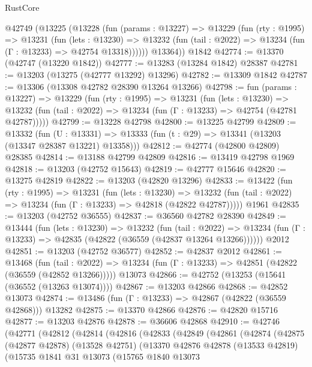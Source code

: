 \begin{lexlean}{RustCore}
\begin{coremodule}
    @42749
      (@13225
        (@13228
          (fun (params : @13227) =>
          @13229
            (fun (rty : @1995) =>
            @13231
              (fun (lets : @13230) =>
              @13232 (fun (tail : @2022) => @13234 (fun (Γ : @13233) => @42754 @13318))))))
        @13364))
    @1842
@42774 := @13370 (@42747 (@13220 @1842))
@42777 := @13283 (@13284 @1842) @28387
@42781 := @13203 (@13275 (@42777 @13292) @13296)
@42782 := @13309 @1842
@42787 := @13306 (@13308 @42782 @28390 @13264 @13266)
@42798 := fun (params : @13227) =>
  @13229
    (fun (rty : @1995) =>
    @13231
      (fun (lets : @13230) =>
      @13232 (fun (tail : @2022) => @13234 (fun (Γ : @13233) => @42754 (@42781 @42787)))))
@42799 := @13228 @42798
@42800 := @13225 @42799
@42809 := @13332
    (fun (U : @13331) => @13333 (fun (t : @29) => @13341 (@13203 (@13347 @28387 @13221) @13358)))
@42812 := @42774 (@42800 @42809) @28385
@42814 := @13188 @42799 @42809
@42816 := @13419 @42798 @1969
@42818 := @13203 (@42752 @15643)
@42819 := @42777 @15646
@42820 := @13275 @42819
@42822 := @13203 (@42820 @13296)
@42833 := @13422
    (fun (rty : @1995) =>
    @13231
      (fun (lets : @13230) =>
      @13232 (fun (tail : @2022) => @13234 (fun (Γ : @13233) => @42818 (@42822 @42787)))))
    @1961
@42835 := @13203 (@42752 @36555)
@42837 := @36560 @42782 @28390
@42849 := @13444
    (fun (lets : @13230) =>
    @13232
      (fun (tail : @2022) =>
      @13234 (fun (Γ : @13233) => @42835 (@42822 (@36559 (@42837 @13264 @13266))))))
    @2012
@42851 := @13203 (@42752 @36577)
@42852 := @42837 @2012
@42861 := @13468
    (fun (tail : @2022) => @13234 (fun (Γ : @13233) => @42851 (@42822 (@36559 (@42852 @13266)))))
    @13073
@42866 := @42752 (@13253 (@15641 (@36552 (@13263 @13074))))
@42867 := @13203 @42866
@42868 := @42852 @13073
@42874 := @13486 (fun (Γ : @13233) => @42867 (@42822 (@36559 @42868))) @13282
@42875 := @13370 @42866
@42876 := @42820 @15716
@42877 := @13203 @42876
@42878 := @36606 @42868
@42910 := @42746
    (@42771
      (@42812
        (@42814
          (@42816
            (@42833
              (@42849
                (@42861
                  (@42874
                    (@42875
                      (@42877 @42878)
                      (@13528 @42751)
                      (@13370
                        @42876
                        @42878
                        (@13533 @42819)
                        (@15735
                          @1841
                          @31
                          @13073
                          (@15765
                            @1840
                            @13073

\end{coremodule}
\end{lexlean}
